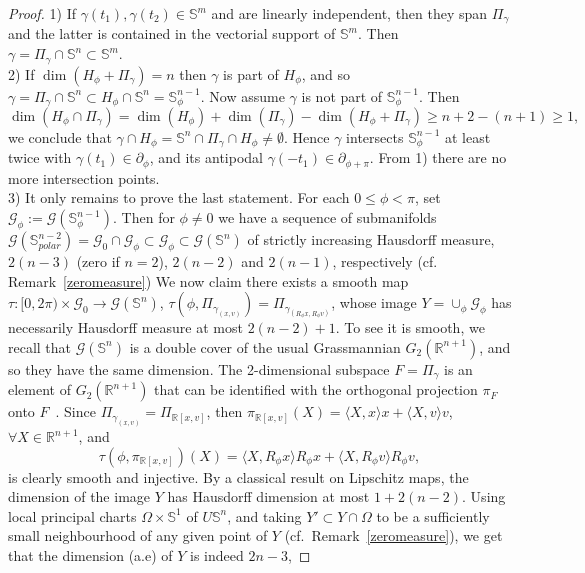 \documentclass[11pt,a4paper,times]{amsart}
\theoremstyle{plain}
\theoremstyle{definition}
\numberwithin{equation}{section}
\newcommand{\R}{\mathbb{R}}
\newcommand{\Se}{\mathbb{S}}
\newcommand{\G}[1]{\mathcal{G}_{#1}}
\begin{document}
{\begin{proof}
 1) If $\gamma(t_1),\gamma(t_2)\in \Se^m$ and are linearly independent, then they span $\Pi_{\gamma}$ and the latter is contained in the vectorial support of $\Se^m$.
Then $\gamma= \Pi_{\gamma}\cap \Se^n\subset \Se^m$.\\[1mm]
 2) If $\dim(H_{\phi}+\Pi_{\gamma})=n$ then $\gamma$ is part of $H_{\phi}$, and so
 $\gamma=\Pi_{\gamma}\cap \Se^n\subset H_{\phi}\cap \Se^n=\Se^{n-1}_{\phi}$.
Now assume $\gamma$ is not part of $\Se^{n-1}_{\phi}$.
Then
 \[
 \dim(H_{\phi}\cap \Pi_{\gamma})=\dim(H_{\phi})+ \dim(\Pi_{\gamma})-\dim(H_{\phi}+\Pi_{\gamma})\geq n+2-(n+1)\geq 1,
 \]
 we conclude that $\gamma\cap H_{\phi}= \Se^n\cap \Pi_{\gamma}\cap H_{\phi}\neq \emptyset$.
Hence $\gamma$ intersects $\Se^{n-1}_{\phi}$ at least twice with $\gamma(t_1)\in\partial_{\phi}$, and its antipodal $\gamma(-t_1)\in \partial_{\phi+\pi}$.
From 1) there are no more intersection points.\\[1mm]
3) It only remains  to prove the last statement. 
For each $0\leq \phi<\pi$, set $\G{\phi}:=\mathcal{G}(\Se^{n-1}_{\phi})$. 
Then  for $\phi\neq 0$ we have a sequence  of submanifolds $\mathcal{G}(\Se^{n-2}_{polar})=\G{0}\cap \G{\phi}\subset \G{\phi}\subset\mathcal{G}(\Se^{n}) $ of strictly increasing Hausdorff measure, $2(n-3)$ (zero if $n=2$), $2(n-2)$ and  $2(n-1)$, respectively (cf. Remark~\eqref{zeromeasure})
%
 We now claim there exists a smooth map \ $\tau:[0, 2\pi)\times \G{0}\to \mathcal{G}(\Se^{n})$,
$\tau(\phi, \Pi_{\gamma_{(x,v)}} )=\Pi_{\gamma_{(R_{\phi}x,R_{\phi}v)}}$,  whose image $Y=\cup_{\phi}\G{\phi}$ has necessarily Hausdorff measure at most $2(n-2)+1$. To
see it is smooth, we recall that  $\mathcal{G}(\Se^n)$ is a double cover of the usual Grassmannian $G_2(\R^{n+1})$, and so they have the same dimension. The 2-dimensional subspace
$F=\Pi_{\gamma}$ is an element of $G_2(\R^{n+1})$ that can be identified with  the orthogonal projection $\pi_F$  onto
$F$~\cite{ms}. Since $\Pi_{\gamma_{(x,v)}}=\Pi_{\R[x,v]}$, 
then $\pi_{\R[x,v]}(X)=\langle X, x\rangle x+\langle X, v\rangle v$, $\forall X\in \R^{n+1}$, and 
\[\tau(\phi, \pi_{\R[x,v]})(X)=\langle X, R_{\phi}x\rangle R_{\phi}x+\langle X, R_{\phi}v\rangle R_{\phi} v, \]
is clearly smooth and injective. By a classical result on Lipschitz maps, the dimension of the image $Y$ has Hausdorff dimension at most
$1+ 2(n-2)$. Using local principal charts $\Omega\times \mathbb{S}^1$ of $U\Se^n$, and taking $Y'\subset Y\cap \Omega$ to be a sufficiently small neighbourhood  of any given point of $Y$ (cf.\ Remark~\ref{zeromeasure}), we get that the dimension (a.e) of $Y$ is indeed  $2n-3$,

\end{proof}}
\end{document}
